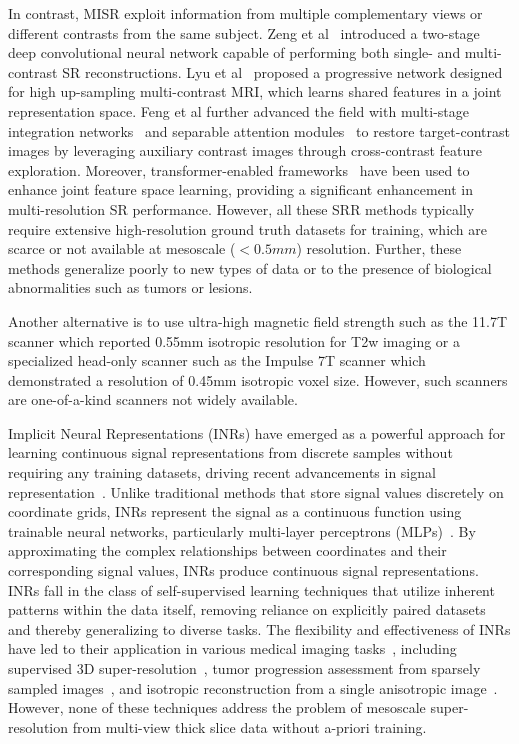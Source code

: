 \documentclass[AMA,STIX2COL]{MRM}
\begin{document}
%
In contrast, MISR exploit information from multiple complementary views or different contrasts from the same subject\cite{wu2021irem, rousseau2010non}. 
%
Zeng et al~\cite{zeng2018simultaneous} introduced a two-stage deep convolutional neural network capable of performing both single- and multi-contrast SR reconstructions. Lyu et al~\cite{lyu2020multi} proposed a progressive network designed for high up-sampling multi-contrast MRI, which learns shared features in a joint representation space. Feng et al further advanced the field with  multi-stage integration networks~\cite{feng2021multi} and separable attention modules~\cite{feng2024exploring} to restore target-contrast images by leveraging auxiliary contrast images through cross-contrast feature exploration.
%
Moreover, transformer-enabled frameworks~\cite{li2023multi, lyu2023multicontrast, li2022transformer, li2022wavtrans, li2024rethinking, li2023dudoinet} have been used to enhance joint feature space learning, providing a significant enhancement in multi-resolution SR performance.
However, all these SRR methods typically require extensive high-resolution ground truth datasets for training, which are scarce or not available at mesoscale ($<0.5mm$) resolution. Further, these methods generalize poorly to new types of data \cite{willemink2022toward} or to the presence of biological abnormalities such as tumors or lesions. 

Another alternative is to use ultra-high magnetic field strength such as the 11.7T scanner which reported 0.55mm isotropic resolution for T2w imaging \cite{boulant2024vivo} or a specialized head-only scanner such as the Impulse 7T scanner \cite{feinberg2023next} which demonstrated a resolution of 0.45mm isotropic voxel size. However, such scanners are one-of-a-kind scanners not widely available.

%
Implicit Neural Representations (INRs) have emerged as a powerful approach for learning continuous signal representations from discrete samples without requiring any training datasets, driving recent advancements in signal representation~\cite{sitzmann2020implicit, dwedari2024estimating, consagra2024neural}. Unlike traditional methods that store signal values discretely on coordinate grids, INRs represent the signal as a continuous function using trainable neural networks, particularly multi-layer perceptrons (MLPs)~\cite{mildenhall2021nerf}. By approximating the complex relationships between coordinates and their corresponding signal values, INRs produce continuous signal representations. INRs fall in the class of self-supervised learning techniques that utilize inherent patterns within the data itself, removing reliance on explicitly paired datasets and thereby generalizing to diverse tasks. The flexibility and effectiveness of INRs have led to their application in various medical imaging tasks~\cite{ye2023super, mcginnis2023single}, including supervised 3D super-resolution~\cite{wu2022arbitrary}, tumor progression assessment from sparsely sampled images~\cite{shen2022nerp}, and isotropic reconstruction from a single anisotropic image~\cite{zhang2023self}. However, none of these techniques address the problem of mesoscale super-resolution from multi-view thick slice data without a-priori training.
\end{document}
